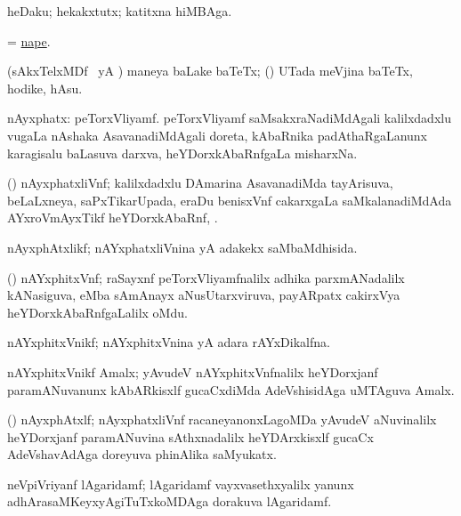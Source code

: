 \bentry
{}
\gl{\nA}
\bmng
heDaku; hekakxtutx; katitxna hiMBAga. 
\emng

\noindent
\gl{\pagu}
\bmng
  = \hyperlink{nape}{nape}. 
\emng
\eentry

\bentry
{}
\gl{\nA}
\bmng
(sAkxTelxMDf \parx\ yA \pArxparx) maneya baLake baTeTx; (\kanmu) UTada meVjina baTeTx, hodike, hAsu. 
\emng
\eentry

\bentry
{}
\gl{\nA}
\bmng
nAyxphatx: 
\banum
{} peTorxVliyamf. 
 peTorxVliyamf saMsakxraNadiMdAgali kalilxdadxlu \mo vugaLa nAshaka AsavanadiMdAgali doreta, kAbaRnika padAthaRgaLanunx karagisalu baLasuva darxva, heYDorxkAbaRnfgaLa misharxNa. 
\eanum
\emng
\eentry

\bentry
{}
\gl{\nA}
\bmng
(\ravi) nAyxphatxliVnf; kalilxdadxlu DAmarina AsavanadiMda tayArisuva, beLaLxneya, saPxTikarUpada, eraDu benisxVnf cakarxgaLa saMkalanadiMdAda AYxroVmAyxTikf heYDorxkAbaRnf, . 
\emng
\eentry

\bentry
{}
\gl{\gu}
\bmng
nAyxphAtxlikf; nAYxphatxliVnina yA adakekx saMbaMdhisida. 
\emng
\eentry

\bentry
{}
\gl{\nA}
\bmng
(\ravi) nAYxphitxVnf; raSayxnf peTorxVliyamfnalilx adhika parxmANadalilx kANasiguva,  eMba sAmAnayx aNusUtarxviruva, payARpatx cakirxVya heYDorxkAbaRnfgaLalilx oMdu. 
\emng
\eentry

\bentry
{}
\gl{\gu}
\bmng
nAYxphitxVnikf; nAYxphitxVnina yA adara rAYxDikalfna. 
\emng
\eentry

\bentry
{}
\gl{\nA}
\bmng
nAYxphitxVnikf Amalx; yAvudeV nAYxphitxVnfnalilx heYDorxjanf paramANuvanunx kAbARkisxlf gucaCxdiMda AdeVshisidAga uMTAguva Amalx. 
\emng
\eentry

\bentry
{}
\gl{\nA}
\bmng
(\ravi) nAyxphAtxlf; nAyxphatxliVnf racaneyanonxLagoMDa yAvudeV aNuvinalilx heYDorxjanf paramANuvina sAthxnadalilx heYDArxkisxlf gucaCx AdeVshavAdAga doreyuva phinAlika saMyukatx. 
\emng
\eentry

\bentry
{}
\gl{\nA\ (\gu)}
\bmng
neVpiVriyanf lAgaridamf; lAgaridamf vayxvasethxyalilx yanunx  adhArasaMKeyxyAgiTuTxkoMDAga dorakuva lAgaridamf. 
\emng
\eentry

